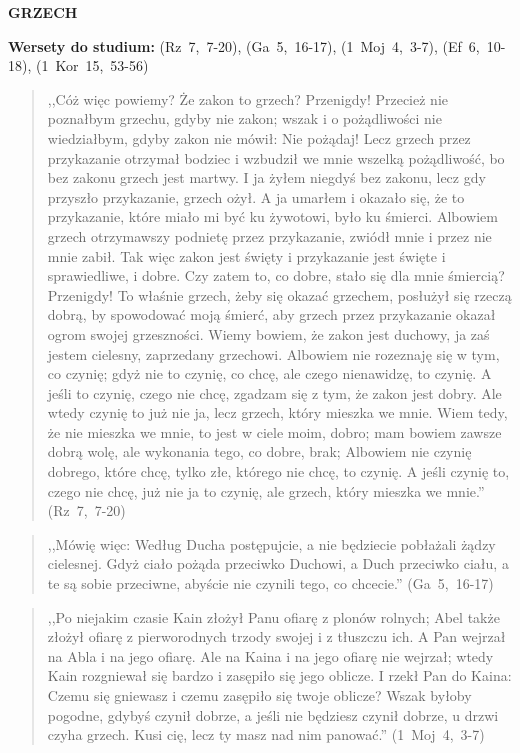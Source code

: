 \documentclass[10pt,a4paper,oneside]{article}
\begin{document}
\centerline{\textbf{\MakeUppercase{Grzech}}}
\begin{center}
\textbf{Wersety do studium:} (Rz~7,~7-20), (Ga~5,~16-17), (1~Moj~4,~3-7), (Ef~6,~10-18), (1~Kor~15,~53-56)
\end{center}
\begin{quote}
,,Cóż więc powiemy? Że zakon to grzech? Przenigdy! Przecież nie poznałbym grzechu, gdyby nie zakon; wszak i o pożądliwości nie wiedziałbym, gdyby zakon nie mówił: Nie pożądaj! Lecz grzech przez przykazanie otrzymał bodziec i wzbudził we mnie wszelką pożądliwość, bo bez zakonu grzech jest martwy. I ja żyłem niegdyś bez zakonu, lecz gdy przyszło przykazanie, grzech ożył. A ja umarłem i okazało się, że to przykazanie, które miało mi być ku żywotowi, było ku śmierci. Albowiem grzech otrzymawszy podnietę przez przykazanie, zwiódł mnie i przez nie mnie zabił. Tak więc zakon jest święty i przykazanie jest święte i sprawiedliwe, i dobre. Czy zatem to, co dobre, stało się dla mnie śmiercią? Przenigdy! To właśnie grzech, żeby się okazać grzechem, posłużył się rzeczą dobrą, by spowodować moją śmierć, aby grzech przez przykazanie okazał ogrom swojej grzeszności. Wiemy bowiem, że zakon jest duchowy, ja zaś jestem cielesny, zaprzedany grzechowi. Albowiem nie rozeznaję się w tym, co czynię; gdyż nie to czynię, co chcę, ale czego nienawidzę, to czynię. A jeśli to czynię, czego nie chcę, zgadzam się z tym, że zakon jest dobry. Ale wtedy czynię to już nie ja, lecz grzech, który mieszka we mnie. Wiem tedy, że nie mieszka we mnie, to jest w ciele moim, dobro; mam bowiem zawsze dobrą wolę, ale wykonania tego, co dobre, brak; Albowiem nie czynię dobrego, które chcę, tylko złe, którego nie chcę, to czynię. A jeśli czynię to, czego nie chcę, już nie ja to czynię, ale grzech, który mieszka we mnie.'' (Rz~7,~7-20)
\end{quote}
\begin{quote}
,,Mówię więc: Według Ducha postępujcie, a nie będziecie pobłażali żądzy cielesnej. Gdyż ciało pożąda przeciwko Duchowi, a Duch przeciwko ciału, a te są sobie przeciwne, abyście nie czynili tego, co chcecie.'' (Ga~5,~16-17)
\end{quote}
\begin{quote}
,,Po niejakim czasie Kain złożył Panu ofiarę z plonów rolnych; Abel także złożył ofiarę z pierworodnych trzody swojej i z tłuszczu ich. A Pan wejrzał na Abla i na jego ofiarę. Ale na Kaina i na jego ofiarę nie wejrzał; wtedy Kain rozgniewał się bardzo i zasępiło się jego oblicze. I rzekł Pan do Kaina: Czemu się gniewasz i czemu zasępiło się twoje oblicze? Wszak byłoby pogodne, gdybyś czynił dobrze, a jeśli nie będziesz czynił dobrze, u drzwi czyha grzech. Kusi cię, lecz ty masz nad nim panować.'' (1~Moj~4,~3-7)
\end{quote}
\end{document}
